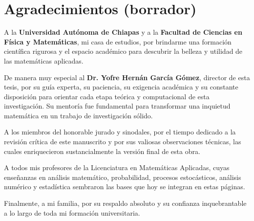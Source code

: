 \cleardoublepage
\thispagestyle{empty}
\vspace*{1.5cm}
\section*{Agradecimientos (borrador)}
\vspace{0.4cm}

A la \textbf{Universidad Autónoma de Chiapas} y a la \textbf{Facultad de Ciencias en Física y Matemáticas}, mi casa de estudios, por brindarme una formación científica rigurosa y el espacio académico para descubrir la belleza y utilidad de las matemáticas aplicadas.

De manera muy especial al \textbf{Dr. Yofre Hernán García Gómez}, director de esta tesis, por su guía experta, su paciencia, su exigencia académica y su constante disposición para orientar cada etapa teórica y computacional de esta investigación. Su mentoría fue fundamental para transformar una inquietud matemática en un trabajo de investigación sólido.

A los miembros del honorable jurado y sinodales, por el tiempo dedicado a la revisión crítica de este manuscrito y por sus valiosas observaciones técnicas, las cuales enriquecieron sustancialmente la versión final de esta obra.

A todos mis profesores de la Licenciatura en Matemáticas Aplicadas, cuyas enseñanzas en análisis matemático, probabilidad, procesos estocásticos, análisis numérico y estadística sembraron las bases que hoy se integran en estas páginas.

Finalmente, a mi familia, por su respaldo absoluto y su confianza inquebrantable a lo largo de toda mi formación universitaria.

\cleardoublepage